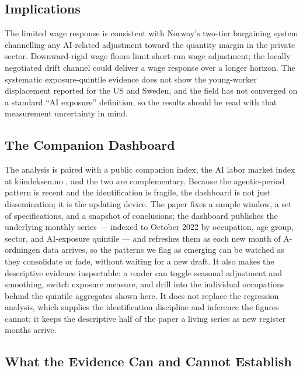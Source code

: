 \documentclass[12pt]{article}
\begin{document}



\subsection{Implications}\label{sec:discussion:implications}

The limited wage response is consistent with Norway's two-tier bargaining system \citep{bhuller2022} channelling any AI-related adjustment toward the quantity margin in the private sector. Downward-rigid wage floors limit short-run wage adjustment; the locally negotiated drift channel could deliver a wage response over a longer horizon. The systematic exposure-quintile evidence does not show the young-worker displacement reported for the US and Sweden, and the field has not converged on a standard ``AI exposure'' definition, so the results should be read with that measurement uncertainty in mind.


\subsection{The Companion Dashboard}\label{sec:discussion:dashboard}

The analysis is paired with a public companion index, the AI labor market index at kiindeksen.no \citep{kiindeksen2026}, and the two are complementary. Because the agentic-period pattern is recent and the identification is fragile, the dashboard is not just dissemination; it is the updating device. The paper fixes a sample window, a set of specifications, and a snapshot of conclusions; the dashboard publishes the underlying monthly series --- indexed to October 2022 by occupation, age group, sector, and AI-exposure quintile --- and refreshes them as each new month of A-ordningen data arrives, so the patterns we flag as emerging can be watched as they consolidate or fade, without waiting for a new draft. It also makes the descriptive evidence inspectable: a reader can toggle seasonal adjustment and smoothing, switch exposure measure, and drill into the individual occupations behind the quintile aggregates shown here. It does not replace the regression analysis, which supplies the identification discipline and inference the figures cannot; it keeps the descriptive half of the paper a living series as new register months arrive.


\subsection{What the Evidence Can and Cannot Establish}\label{sec:discussion:scope}
\end{document}

